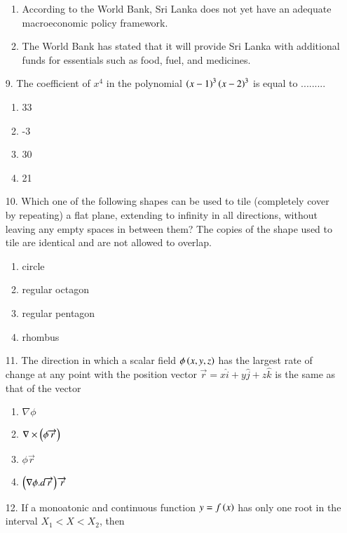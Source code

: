 \documentclass[journal]{IEEEtran}
\begin{document}
\begin{enumerate}
\begin{enumerate}[label = (\Alph*)]
        \item According to the World Bank, Sri Lanka does not yet have an adequate
        macroeconomic policy framework.
        \item The World Bank has stated that it will provide Sri Lanka with additional funds for
        essentials such as food, fuel, and medicines.
    \end{enumerate}
    \item[9.] The coefficient of $x^4$ in the polynomial $\left(x-1\right)^3\left(x-2\right)^3$ is equal to ......... 
    \begin{enumerate}[label = (\Alph*)]
        \item 33
        \item -3
        \item 30
        \item 21
    \end{enumerate}
    \item[10.] Which one of the following shapes can be used to tile (completely cover by
    repeating) a flat plane, extending to infinity in all directions, without leaving any
    empty spaces in between them? The copies of the shape used to tile are identical
    and are not allowed to overlap.
    \begin{enumerate}[label = (\Alph*)]
        \item circle 
        \item regular octagon
        \item regular pentagon
        \item rhombus
    \end{enumerate}
    \item[11.] The direction in which a scalar field $\phi\left(x, y, z\right)$ has the largest rate of change at any point with the position vector $\overrightarrow{r} = x\hat{i} + y\hat{j} +z\hat{k}$ is the same as that of the vector 
    \begin{enumerate}[label = (\Alph*)]
        \item $\nabla \phi$
        \item $\nabla\times\left(\phi\overrightarrow{r}\right)$
        \item $\phi\overrightarrow{r}$
        \item $\left(\nabla\phi.d\overrightarrow{r}\right)\overrightarrow{r}$
    \end{enumerate}
    \item[12.] If a monoatonic and continuous function $y = f\left(x\right)$ has only one root in the interval $X_1<X<X_2$, then 

\end{enumerate}
\end{document}
